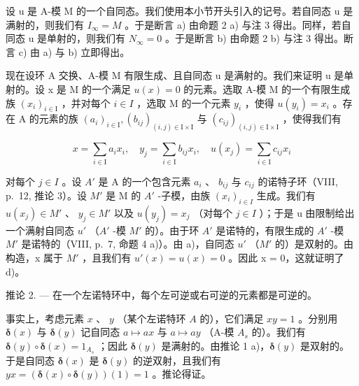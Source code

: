 设 u 是 A-模 M 的一个自同态。我们使用本小节开头引入的记号。若自同态 u 是满射的，则我们有 \(I_{\infty} = M\) 。于是断言 a) 由命题 2 a) 与注 3 得出。同样，若自同态 u 是单射的，则我们有 \(N_{\infty} = 0\) 。于是断言 b) 由命题 2 b) 与注 3 得出。断言 c) 由 a) 与 b) 立即得出。

现在设环 A 交换、A-模 M 有限生成、且自同态 u 是满射的。我们来证明 u 是单射的。设 x 是 M 的一个满足 \(u(x) = 0\) 的元素。选取 A-模 M 的一个有限生成族 \((x_{i})_{i \in \mathrm{I}}\) ，并对每个 \(i \in I\) ，选取 M 的一个元素 \(y_{i}\) ，使得 \(u(y_{i}) = x_{i}\) 。存在 A 的元素的族 \((a_{i})_{i \in \mathrm{I}}, (b_{ij})_{(i,j) \in \mathrm{I} \times \mathrm{I}}\) 与 \((c_{ij})_{(i,j) \in \mathrm{I} \times \mathrm{I}}\) ，使得我们有

\[
x = \sum_ {i \in \mathrm{I}} a _ {i} x _ {i}, \quad y _ {j} = \sum_ {i \in \mathrm{I}} b _ {i j} x _ {i}, \quad u (x _ {j}) = \sum_ {i \in \mathrm{I}} c _ {i j} x _ {i}
\]

对每个 \(j \in I\) 。设 \(A'\) 是 A 的一个包含元素 \(a_i\) 、 \(b_{ij}\) 与 \(c_{ij}\) 的诺特子环（VIII, p.~12, 推论 3）。设 \(M'\) 是 M 的 \(A'\) -子模，由族 \((x_i)_{i \in I}\) 生成。我们有 \(u(x_j) \in M'\) 、 \(y_j \in M'\) 以及 \(u(y_j) = x_j\) （对每个 \(j \in I\) ）；于是 u 由限制给出一个满射自同态 \(u'\) （\(A'\) -模 \(M'\) 的）。由于环 \(A'\) 是诺特的，有限生成的 \(A'\) -模 \(M'\) 是诺特的（VIII, p.~7, 命题 4 a)）。由 a)，自同态 \(u'\) （\(M'\) 的）是双射的。由构造，x 属于 \(M'\) ，且我们有 \(u'(x) = u(x) = 0\) 。因此 x = 0，这就证明了 d)。

推论 2. --- 在一个左诺特环中，每个左可逆或右可逆的元素都是可逆的。

事实上，考虑元素 \(x\) 、 \(y\) （某个左诺特环 \(A\) 的），它们满足 \(xy = 1\) 。分别用 \(\pmb{\delta}(x)\) 与 \(\pmb{\delta}(y)\) 记自同态 \(a \mapsto ax\) 与 \(a \mapsto ay\) （A-模 \(A_s\) 的）。我们有 \(\pmb{\delta}(y) \circ \pmb{\delta}(x) = 1_{A_s}\) ；因此 \(\pmb{\delta}(y)\) 是满射的。由推论 1 a)，\(\pmb{\delta}(y)\) 是双射的。于是自同态 \(\pmb{\delta}(x)\) 是 \(\pmb{\delta}(y)\) 的逆双射，且我们有 \(yx = (\pmb{\delta}(x) \circ \pmb{\delta}(y))(1) = 1\) 。推论得证。
\relax{}
